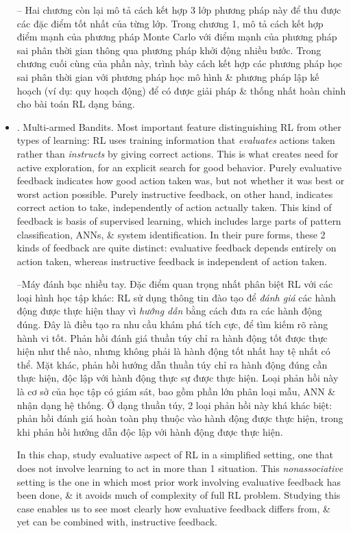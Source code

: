 \documentclass{article}
\begin{document}
\begin{itemize}
    -- Hai chương còn lại mô tả cách kết hợp 3 lớp phương pháp này để thu được các đặc điểm tốt nhất của từng lớp. Trong chương 1, mô tả cách kết hợp điểm mạnh của phương pháp Monte Carlo với điểm mạnh của phương pháp sai phân thời gian thông qua phương pháp khởi động nhiều bước. Trong chương cuối cùng của phần này, trình bày cách kết hợp các phương pháp học sai phân thời gian với phương pháp học mô hình \& phương pháp lập kế hoạch (ví dụ: quy hoạch động) để có được giải pháp \& thống nhất hoàn chỉnh cho bài toán RL dạng bảng.
    \item {. Multi-armed Bandits.} Most important feature distinguishing RL from other types of learning: RL uses training information that {\it evaluates} actions taken rather than {\it instructs} by giving correct actions. This is what creates need for active exploration, for an explicit search for good behavior. Purely evaluative feedback indicates how good action taken was, but not whether it was best or worst action possible. Purely instructive feedback, on other hand, indicates correct action to take, independently of action actually taken. This kind of feedback is basis of supervised learning, which includes large parts of pattern classification, ANNs, \& system identification. In their pure forms, these 2 kinds of feedback are quite distinct: evaluative feedback depends entirely on action taken, whereas instructive feedback is independent of action taken.

    --{\sf Máy đánh bạc nhiều tay.} Đặc điểm quan trọng nhất phân biệt RL với các loại hình học tập khác: RL sử dụng thông tin đào tạo để {\it đánh giá} các hành động được thực hiện thay vì {\it hướng dẫn} bằng cách đưa ra các hành động đúng. Đây là điều tạo ra nhu cầu khám phá tích cực, để tìm kiếm rõ ràng hành vi tốt. Phản hồi đánh giá thuần túy chỉ ra hành động tốt được thực hiện như thế nào, nhưng không phải là hành động tốt nhất hay tệ nhất có thể. Mặt khác, phản hồi hướng dẫn thuần túy chỉ ra hành động đúng cần thực hiện, độc lập với hành động thực sự được thực hiện. Loại phản hồi này là cơ sở của học tập có giám sát, bao gồm phần lớn phân loại mẫu, ANN \& nhận dạng hệ thống. Ở dạng thuần túy, 2 loại phản hồi này khá khác biệt: phản hồi đánh giá hoàn toàn phụ thuộc vào hành động được thực hiện, trong khi phản hồi hướng dẫn độc lập với hành động được thực hiện.

    In this chap, study evaluative aspect of RL in a simplified setting, one that does not involve learning to act in more than 1 situation. This {\it nonassociative} setting is the one in which most prior work involving evaluative feedback has been done, \& it avoids much of complexity of full RL problem. Studying this case enables us to see most clearly how evaluative feedback differs from, \& yet can be combined with, instructive feedback.


\end{itemize}
\end{document}
